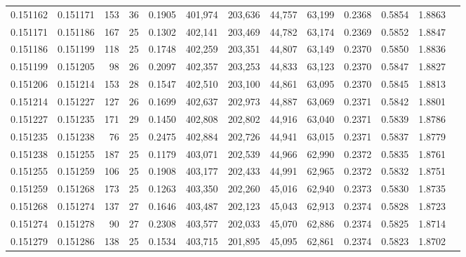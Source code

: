 \begin{tabular}{rrrrrrrrrrrrr}
0.151162 & 0.151171 & 153 &  36 &                                     0.1905 & 401,974 & 203,636 &  44,757 &  63,199 & 0.2368 & 0.5854 & 1.8863 \\
0.151171 & 0.151186 & 167 &  25 &                                     0.1302 & 402,141 & 203,469 &  44,782 &  63,174 & 0.2369 & 0.5852 & 1.8847 \\
0.151186 & 0.151199 & 118 &  25 &                                     0.1748 & 402,259 & 203,351 &  44,807 &  63,149 & 0.2370 & 0.5850 & 1.8836 \\
0.151199 & 0.151205 &  98 &  26 &                                     0.2097 & 402,357 & 203,253 &  44,833 &  63,123 & 0.2370 & 0.5847 & 1.8827 \\
0.151206 & 0.151214 & 153 &  28 &                                     0.1547 & 402,510 & 203,100 &  44,861 &  63,095 & 0.2370 & 0.5845 & 1.8813 \\
0.151214 & 0.151227 & 127 &  26 &                                     0.1699 & 402,637 & 202,973 &  44,887 &  63,069 & 0.2371 & 0.5842 & 1.8801 \\
0.151227 & 0.151235 & 171 &  29 &                                     0.1450 & 402,808 & 202,802 &  44,916 &  63,040 & 0.2371 & 0.5839 & 1.8786 \\
0.151235 & 0.151238 &  76 &  25 &                                     0.2475 & 402,884 & 202,726 &  44,941 &  63,015 & 0.2371 & 0.5837 & 1.8779 \\
0.151238 & 0.151255 & 187 &  25 &                                     0.1179 & 403,071 & 202,539 &  44,966 &  62,990 & 0.2372 & 0.5835 & 1.8761 \\
0.151255 & 0.151259 & 106 &  25 &                                     0.1908 & 403,177 & 202,433 &  44,991 &  62,965 & 0.2372 & 0.5832 & 1.8751 \\
0.151259 & 0.151268 & 173 &  25 &                                     0.1263 & 403,350 & 202,260 &  45,016 &  62,940 & 0.2373 & 0.5830 & 1.8735 \\
0.151268 & 0.151274 & 137 &  27 &                                     0.1646 & 403,487 & 202,123 &  45,043 &  62,913 & 0.2374 & 0.5828 & 1.8723 \\
0.151274 & 0.151278 &  90 &  27 &                                     0.2308 & 403,577 & 202,033 &  45,070 &  62,886 & 0.2374 & 0.5825 & 1.8714 \\
0.151279 & 0.151286 & 138 &  25 &                                     0.1534 & 403,715 & 201,895 &  45,095 &  62,861 & 0.2374 & 0.5823 & 1.8702 \\

\end{tabular}
